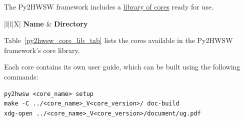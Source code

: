 %

The Py2HWSW framework includes a \href{https://github.com/IObundle/py2hwsw/tree/main/py2hwsw/lib}{library of cores} ready for use.

{
\setlength{\LTcapwidth}{\linewidth} %
\begin{xltabular}{\textwidth}{|l|l|X|}
  \hline
  {\bf Name} & {\bf Directory}  \\ \hline \hline
  \endfirsthead
  \hline
  \caption{Cores available in the library of the Py2HWSW framework. The \textit{Directory} column is the path to the core's setup directory, relative to the Py2HWSW lib directory \texttt{py2hwsw/lib/}.}
  \endlastfoot

  

  \label{py2hwsw_core_lib_tab}
\end{xltabular}
}

Table~\ref{py2hwsw_core_lib_tab} lists the cores available in the Py2HWSW framework's core library.

Each core contains its own user guide, which can be built using the following commands:

\begin{lstlisting}
py2hwsw <core_name> setup
make -C ../<core_name>_V<core_version>/ doc-build
xdg-open ../<core_name>_V<core_version>/document/ug.pdf
\end{lstlisting}
